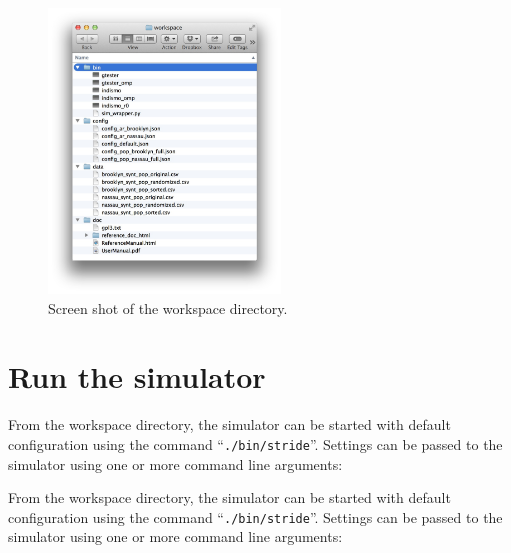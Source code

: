 \begin{figure}[h]
	\begin{center}
		\includegraphics[width=0.55\textwidth]{images/screen_shot_workspace_dir.pdf}  
	\end{center}
	\caption{Screen shot of the workspace directory.}
	\label{fig:workspace}
\end{figure}



\section{Run the simulator}


From the workspace directory, the simulator can be started with default configuration using the command \mbox{``\texttt{./bin/stride}''}. Settings can be passed to the simulator using one or more command line arguments:

From the workspace directory, the simulator can be started with default configuration using the command \mbox{``\texttt{./bin/stride}''}. Settings can be passed to the simulator using one or more command line arguments:

